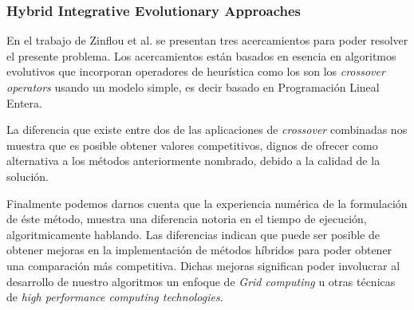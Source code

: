 \subsubsection{Hybrid Integrative Evolutionary Approaches}
En el trabajo de Zinflou et al. \cite{HYB1} se presentan tres acercamientos para poder
resolver el presente problema. Los acercamientos están basados en esencia en algoritmos evolutivos
que incorporan operadores de heurística como los son los \emph{crossover operators} usando
un modelo simple, es decir basado en  Programación Lineal Entera.

La diferencia que existe entre dos de las aplicaciones de \emph{crossover} combinadas nos muestra que es posible
obtener valores competitivos, dignos de ofrecer como alternativa a los métodos anteriormente nombrado, debido
a la calidad de la solución.

Finalmente podemos darnos cuenta que la experiencia numérica de la formulación de éste método, muestra una diferencia
notoria en el tiempo de ejecución, algoritmicamente hablando.
Las diferencias indican que puede ser posible de obtener mejoras en la implementación de métodos híbridos para 
poder obtener una comparación más competitiva. Dichas mejoras significan poder involucrar al desarrollo de nuestro
algoritmos un enfoque de \emph{Grid computing} u otras técnicas de \emph{high performance computing technologies}.
